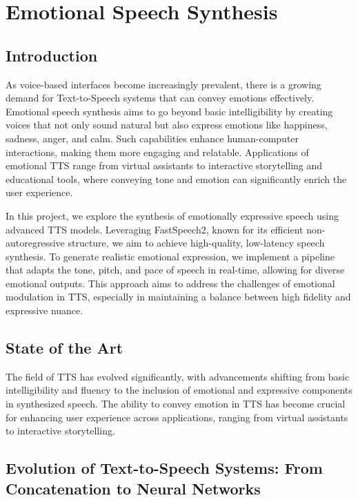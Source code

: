 \section{Emotional Speech Synthesis}

\subsection{Introduction}

As voice-based interfaces become increasingly prevalent, there is a growing demand for Text-to-Speech systems that can convey emotions effectively. Emotional speech synthesis aims to go beyond basic intelligibility by creating voices that not only sound natural but also express emotions like happiness, sadness, anger, and calm. Such capabilities enhance human-computer interactions, making them more engaging and relatable. Applications of emotional TTS range from virtual assistants to interactive storytelling and educational tools, where conveying tone and emotion can significantly enrich the user experience.

In this project, we explore the synthesis of emotionally expressive speech using advanced TTS models. Leveraging FastSpeech2, known for its efficient non-autoregressive structure, we aim to achieve high-quality, low-latency speech synthesis. To generate realistic emotional expression, we implement a pipeline that adapts the tone, pitch, and pace of speech in real-time, allowing for diverse emotional outputs. This approach aims to address the challenges of emotional modulation in TTS, especially in maintaining a balance between high fidelity and expressive nuance.

\subsection{State of the Art}

The field of TTS has evolved significantly, with advancements shifting from basic intelligibility and fluency to the inclusion of emotional and expressive components in synthesized speech. The ability to convey emotion in TTS has become crucial for enhancing user experience across applications, ranging from virtual assistants to interactive storytelling.

\subsection{Evolution of Text-to-Speech Systems: From Concatenation to Neural Networks}

